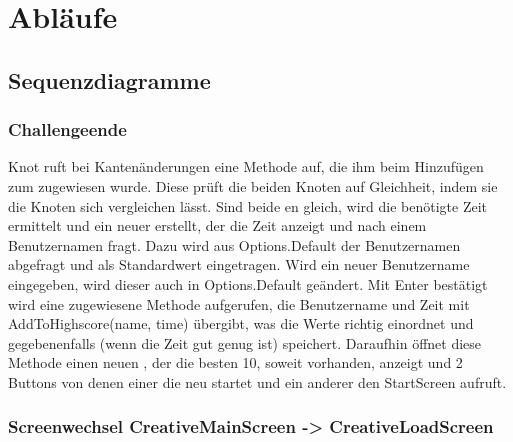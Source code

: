 \chapter{Abläufe}

\section{Sequenzdiagramme}

\subsection{Challengeende}

Knot ruft bei Kantenänderungen eine Methode auf, die ihm beim Hinzufügen zum  zugewiesen wurde. Diese prüft die beiden Knoten auf Gleichheit, indem sie die Knoten sich vergleichen lässt. Sind beide en gleich, wird die benötigte Zeit ermittelt und ein neuer  erstellt, der die Zeit anzeigt und nach einem Benutzernamen fragt.
\newline
Dazu wird aus Options.Default der Benutzernamen abgefragt und als Standardwert eingetragen. Wird ein neuer Benutzername eingegeben, wird dieser auch in Options.Default geändert. Mit Enter bestätigt wird eine zugewiesene Methode aufgerufen, die Benutzername und Zeit  mit AddToHighscore(name, time) übergibt, was die Werte richtig einordnet und gegebenenfalls (wenn die Zeit gut genug ist) speichert.
\newline
Daraufhin öffnet diese Methode einen neuen , der die besten 10, soweit vorhanden, anzeigt und 2 Buttons 
von denen einer die  neu startet und ein anderer den StartScreen aufruft.

\subsection{Screenwechsel CreativeMainScreen -> CreativeLoadScreen}

